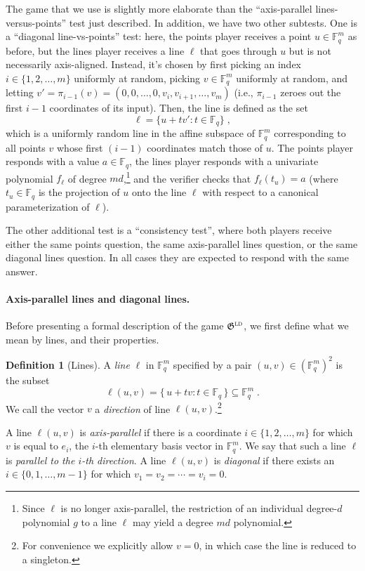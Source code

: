 \documentclass[11pt]{article}
\theoremstyle{definition}
\newtheorem{definition}[theorem]{Definition}
\newcommand{\F}{\ensuremath{\mathbb{F}}}
\newcommand{\ld}{\textsc{ld}}
\newcommand{\game}{\mathfrak{G}}
\renewcommand{\line}{\mathbf{\ell}}
\begin{document}
The game that we use is slightly more elaborate than the ``axis-parallel
lines-versus-points'' test just described.
In addition, we have two other subtests.
One is a ``diagonal line-vs-points'' test: here, the points player receives a
point $u \in \F_q^m$ as before, but the lines player receives a line $\line$
that goes through $u$ but is not necessarily axis-aligned.
Instead, it's chosen by first picking an index $i \in \{1,2,\ldots,m\}$
uniformly at random, picking $v \in \F_q^m$ uniformly at random, and letting $v'
= \pi_{i-1}(v) = (0,0,\ldots,0,v_i,v_{i+1},\ldots,v_m)$ (i.e., $\pi_{i-1}$
zeroes out the first $i-1$ coordinates of its input).
Then, the line is defined as the set
\[
	\line = \{ u + tv' : t \in \F_q \}\;,
\]
which is a uniformly random line in the affine subspace of $\F^m_q$
corresponding to all points $v$ whose first $(i-1)$ coordinates match those of
$u$.
The points player responds with a value $a \in \F_q$, the lines player responds
with a univariate polynomial $f_\line$ of degree $md$,\footnote{Since $\line$ is
  no longer axis-parallel, the restriction of an individual degree-$d$
  polynomial $g$ to a line $\line$ may yield a degree $md$ polynomial.}
and the verifier checks that $f_\line(t_u) = a$ (where $t_u \in \F_q$ is the
projection of $u$ onto the line $\line$ with respect to a canonical
parameterization of $\line$).

The other additional test is a ``consistency test'', where both players receive
either the same points question, the same axis-parallel lines question, or the
same diagonal lines question.
In all cases they are expected to respond with the same answer.



\paragraph{Axis-parallel lines and diagonal lines.}
Before presenting a formal description of the game $\game^\ld$, we first define
what we mean by lines, and their properties.

\begin{definition}[Lines]
  \label{def:line}
	A \emph{line} $\line$ in $\F^m_q$ specified by a pair $(u,v) \in (\F_q^m)^2$
  is the subset
  \begin{equation}
    \label{eq:line-set}
    \line(u,v) = \bigl\{\, u + tv : t \in \F_q \,\bigr\} \subseteq \F_q^m \;.
  \end{equation}
  We call the vector $v$ a \emph{direction} of line
  $\line(u,v)$.\footnote{For convenience we explicitly allow
    $v=0$, in which case the line is reduced to a singleton.}
  
  A line $\line(u,v)$ is \emph{axis-parallel} if there is a coordinate $i \in
  \{1,2,\ldots,m\}$ for which $v$ is equal to $e_i$, the $i$-th elementary basis
  vector in $\F_q^m$.
  We say that such a line $\line$ is \emph{parallel to the $i$-th direction}.
  A line $\line(u,v)$ is \emph{diagonal} if there exists an $i \in
  \{0,1,\ldots,m-1\}$ for which $v_1 = v_2 = \cdots = v_i = 0$.
\end{definition}
\end{document}
